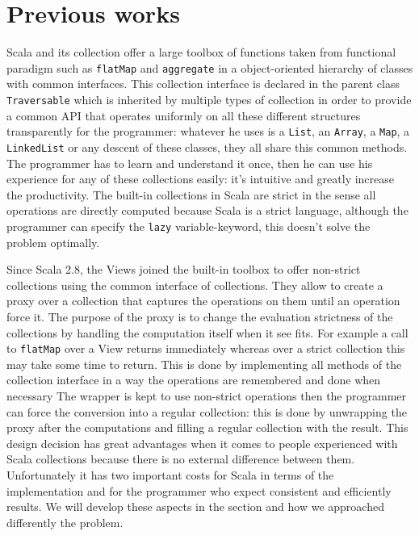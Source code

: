 \documentclass[a4paper,12pt,twocolumn]{article}
\begin{document}
\section{Previous works}
Scala and its collection offer a large toolbox of functions taken from functional paradigm such as \verb|flatMap| and \verb|aggregate| in a object-oriented hierarchy of classes with common interfaces.
This collection interface is declared in the parent class \verb|Traversable|\cite{scala-collections} which is inherited by multiple types of collection in order to provide a common API that operates uniformly on all these different structures transparently for the programmer: whatever he uses is a \verb|List|, an \verb|Array|, a \verb|Map|, a \verb|LinkedList| or any descent of these classes, they all share this common methods.
The programmer has to learn and understand it once, then he can use his experience for any of these collections easily: it's intuitive and greatly increase the productivity.
The built-in collections in Scala are strict in the sense all operations are directly computed because Scala is a strict language, although the programmer can specify the \verb|lazy| variable-keyword, this doesn't solve the problem optimally.

Since Scala 2.8, the Views joined the built-in toolbox to offer non-strict collections using the common interface of collections.
They allow to create a proxy over a collection that captures the operations on them until an operation force it.
The purpose of the proxy is to change the evaluation strictness of the collections by handling the computation itself when it see fits.
For example a call to \verb|flatMap| over a View returns immediately whereas over a strict collection this may take some time to return.
This is done by implementing all methods of the collection interface in a way the operations are remembered and done when necessary
The wrapper is kept to use non-strict operations then the programmer can force the conversion into a regular collection: this is done by unwrapping the proxy after the computations and filling a regular collection with the result.
This design decision has great advantages when it comes to people experienced with Scala collections because there is no external difference between them.
Unfortunately it has two important costs for Scala in terms of the implementation and for the programmer who expect consistent and efficiently results.
We will develop these aspects in the section and how we approached differently the problem.
\end{document}
